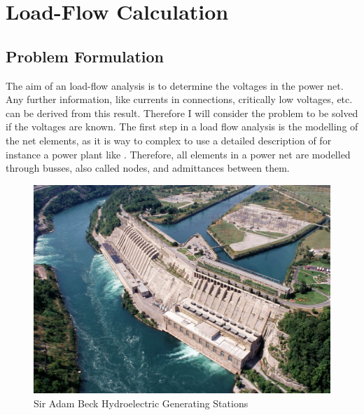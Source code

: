 \chapter{Load-Flow Calculation}

\section{Problem Formulation}
The aim of an load-flow analysis is to determine the voltages in the power net. Any further information, like currents in connections, critically low voltages, etc. can be derived from this result. Therefore I will consider the problem to be solved if the voltages are known.
The first step in a load flow analysis is the modelling of the net elements, as it is way to complex to use a detailed description of for instance a power plant like . Therefore, all elements in a power net are modelled through busses, also called nodes, and admittances between them.

\begin{figure}
	\includegraphics[width=\textwidth]{figures/adam_beck_complex.jpg}
	\caption{Sir Adam Beck Hydroelectric Generating Stations \cite{adam_back_complex}}
	\label{fig:power_plant}
\end{figure}

